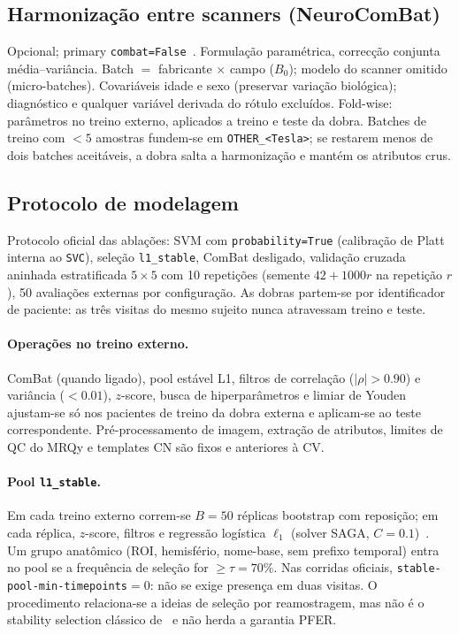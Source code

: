 \documentclass[review]{elsarticle}
\newcommand{\code}[1]{\texttt{#1}}
\begin{document}
	\subsection{Harmonização entre scanners (NeuroComBat)}
	\label{sec:harmonization}
	
	Opcional; primary \code{combat=False}~\cite{fortin-2018}.
	Formulação paramétrica, correcção conjunta média--variância.
	Batch $=$ fabricante $\times$ campo ($B_0$); modelo do scanner omitido (micro-batches).
	Covariáveis idade e sexo (preservar variação biológica); diagnóstico e qualquer variável derivada do rótulo excluídos.
	Fold-wise: parâmetros no treino externo, aplicados a treino e teste da dobra.
	Batches de treino com $<5$ amostras fundem-se em \code{OTHER\_<Tesla>}; se restarem menos de dois batches aceitáveis, a dobra salta a harmonização e mantém os atributos crus.
	
	\subsection{Protocolo de modelagem}
	\label{sec:modelagem}
	
	Protocolo oficial das ablações: SVM com \code{probability=True} (calibração de Platt interna ao \code{SVC}), seleção \code{l1\_stable}, ComBat desligado, validação cruzada aninhada estratificada $5\times 5$ com 10 repetições (semente $42+1000r$ na repetição $r$), 50 avaliações externas por configuração.
	As dobras partem-se por identificador de paciente: as três visitas do mesmo sujeito nunca atravessam treino e teste.
	
	\paragraph{Operações no treino externo.}
	ComBat (quando ligado), pool estável L1, filtros de correlação ($|\rho|>0.90$) e variância ($<0.01$), $z$-score, busca de hiperparâmetros e limiar de Youden ajustam-se só nos pacientes de treino da dobra externa e aplicam-se ao teste correspondente.
	Pré-processamento de imagem, extração de atributos, limites de QC do MRQy e templates CN são fixos e anteriores à CV.
	
	\paragraph{Pool \code{l1\_stable}.}
	Em cada treino externo correm-se $B=50$ réplicas bootstrap com reposição; em cada réplica, $z$-score, filtros e regressão logística $\ell_1$ (solver SAGA, $C=0.1$)~\cite{bach-2008,meinshausen-2010}.
	Um grupo anatômico (ROI, hemisfério, nome-base, sem prefixo temporal) entra no pool se a frequência de seleção for $\ge\tau=70\%$.
	Nas corridas oficiais, \code{stable-pool-min-timepoints}$=0$: não se exige presença em duas visitas.
	O procedimento relaciona-se a ideias de seleção por reamostragem, mas não é o stability selection clássico de~\citet{meinshausen-2010} e não herda a garantia PFER.
	
\end{document}
